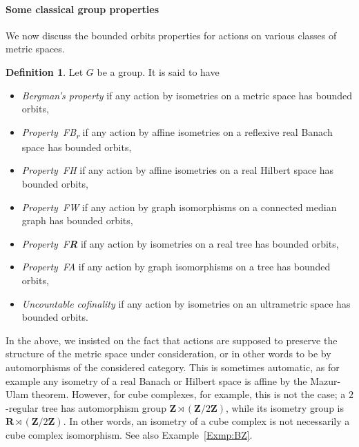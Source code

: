 \documentclass[a4paper]{article}
\newcounter{mycomment}
\newcommand{\mycomment}[2][]{\refstepcounter{mycomment}{\todo[color={green!33},size=\small]{\textbf{Commentaire [\uppercase{#1}\themycomment]:}~#2}}}
\newcommand{\PH}[1]{\todo[color={blue!33},size=small]{\textbf{PH :} #1}}
\newcommand{\GS}[1]{\mycomment[GS]{#1}}
\theoremstyle{definition}
\newtheorem{defn}[lem]{Definition}
\newtheorem{exmp}[lem]{Example}
\newcommand*{\field}[1]{\mathbf{#1}}
\newcommand*{\Z}{\field{Z}}
\newcommand*{\R}{\field{R}}
\newcommand*{\FB}{FB\textsubscript{r}}
\newcommand*{\FH}{FH}
\newcommand*{\FW}{FW}
\newcommand*{\FA}{FA}
\newcommand*{\FR}{F\textbf{R}}
\newcommand{\setst}[2]{\{#1\ |\ #2\}}
\begin{document}
%
%
%
%
%
%
%
\paragraph{Some classical group properties}
We now discuss the bounded orbits properties for actions on various classes of metric spaces.

%
%
\begin{defn}\label{Def:FHFA}
Let $G$ be a group.
It is said to have
\begin{itemize}
\item\emph{Bergman's property} if  any action by isometries on a metric space has bounded orbits,
\item\emph{Property~\FB} if any action by affine isometries on a reflexive real Banach space has bounded orbits,
\item \emph{Property~\FH} if any action by affine isometries on a real Hilbert space has bounded orbits,
\item
\emph{Property~\FW} if any action by graph isomorphisms on a connected median graph has bounded orbits,
\item
\emph{Property~\FR} if any action by isometries on a real tree has bounded orbits,
\item
\emph{Property~\FA} if any action by graph isomorphisms on a tree has bounded orbits,
\item
\emph{Uncountable cofinality} if any action by isometries on an ultrametric space has bounded orbits.
\end{itemize}
\end{defn}
%
%
In the above, we insisted on the fact that actions are supposed to preserve the structure of the metric space under consideration, or in other words to be by automorphisms of the considered category.
This is sometimes automatic, as for example any isometry of a real Banach or Hilbert space is affine by the Mazur-Ulam theorem.
However, for cube complexes, for example, this is not the case; a $2$-regular tree has automorphism group $\Z\rtimes(\Z/2\Z)$, while its isometry group is $\R\rtimes(\Z/2\Z)$.
In other words, an isometry of a cube complex is not necessarily a cube complex isomorphism.
See also Example~\ref{Exmp:BZ}.
\end{document}
